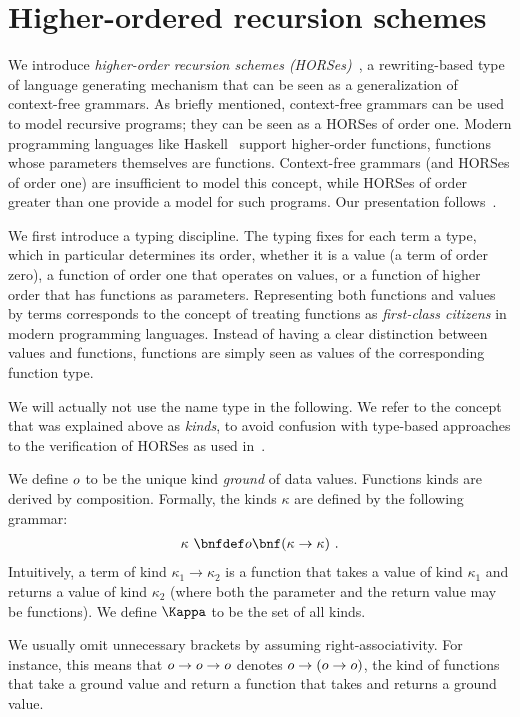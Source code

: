 \documentclass[../../diss.tex]{subfiles}
\begin{document}
\section{Higher-ordered recursion schemes}%
\label{Section:HORS}%

We introduce \emph{higher-order recursion schemes (HORSes)}~\cite{Nivat72,CourcelleN78}, a rewriting-based type of language generating mechanism that can be seen as a generalization of context-free grammars.
As briefly mentioned, context-free grammars can be used to model recursive programs;
they can be seen as a HORSes of order one.
Modern programming languages like Haskell~\cite{Haskell03} support higher-order functions, \ie functions whose parameters themselves are functions.
Context-free grammars (and HORSes of order one) are insufficient to model this concept, while HORSes of order greater than one provide a model for such programs.
Our presentation follows~\cite{Haddad12}.

We first introduce a typing discipline.
The typing fixes for each term a type, which in particular determines its order, \ie whether it is a value (a term of order zero), a function of order one that operates on values, or a function of higher order that has functions as parameters.
Representing both functions and values by terms corresponds to the concept of treating functions as \emph{first-class citizens} in modern programming languages.
Instead of having a clear distinction between values and functions, functions are simply seen as values of the corresponding function type.

We will actually not use the name type in the following.
We refer to the concept that was explained above as \emph{kinds}, to avoid confusion with type-based approaches to the verification of HORSes as used \eg in~\cite{Kobayashi09}.

We define $o$ to be the unique kind \emph{ground} of data values.
Functions kinds are derived by composition.
Formally, the kinds $\kappa$ are defined by the following grammar:
\begin{align*}
     \kappa\ \bnfdef \ground \bnf ( \kappa \to \kappa)\ .
\end{align*}
Intuitively, a term of kind $\kappa_1 \to \kappa_2$ is a function that takes a value of kind $\kappa_1$ and returns a value of kind $\kappa_2$ (where both the parameter and the return value may be functions).
We define $\kinds$ to be the set of all kinds.

We usually omit unnecessary brackets by assuming right-associativity.
For instance, this means that $o \to o \to o$ denotes $o \to (o \to o)$, \ie the kind of functions that take a ground value and return a function that takes and returns a ground value.
\end{document}
